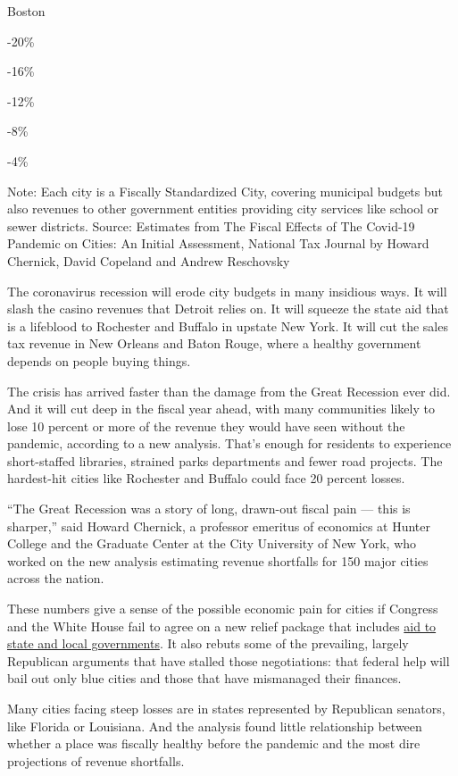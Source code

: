 Boston

-20\%

-16\%

-12\%

-8\%

-4\%

Note: Each city is a Fiscally Standardized City, covering municipal
budgets but also revenues to other government entities providing city
services like school or sewer districts. Source: Estimates from The
Fiscal Effects of The Covid-19 Pandemic on Cities: An Initial
Assessment, National Tax Journal by Howard Chernick, David Copeland and
Andrew Reschovsky

The coronavirus recession will erode city budgets in many insidious
ways. It will slash the casino revenues that Detroit relies on. It will
squeeze the state aid that is a lifeblood to Rochester and Buffalo in
upstate New York. It will cut the sales tax revenue in New Orleans and
Baton Rouge, where a healthy government depends on people buying things.

The crisis has arrived faster than the damage from the Great Recession
ever did. And it will cut deep in the fiscal year ahead, with many
communities likely to lose 10 percent or more of the revenue they would
have seen without the pandemic, according to a new analysis. That's
enough for residents to experience short-staffed libraries, strained
parks departments and fewer road projects. The hardest-hit cities like
Rochester and Buffalo could face 20 percent losses.

``The Great Recession was a story of long, drawn-out fiscal pain ---
this is sharper,'' said Howard Chernick, a professor emeritus of
economics at Hunter College and the Graduate Center at the City
University of New York, who worked on the new analysis estimating
revenue shortfalls for 150 major cities across the nation.

These numbers give a sense of the possible economic pain for cities if
Congress and the White House fail to agree on a new relief package that
includes
\href{https://www.nytimes3xbfgragh.onion/2020/08/14/business/economy/state-local-budget-pain.html}{aid
to state and local governments}. It also rebuts some of the prevailing,
largely Republican arguments that have stalled those negotiations: that
federal help will bail out only blue cities and those that have
mismanaged their finances.

Many cities facing steep losses are in states represented by Republican
senators, like Florida or Louisiana. And the analysis found little
relationship between whether a place was fiscally healthy before the
pandemic and the most dire projections of revenue shortfalls.

